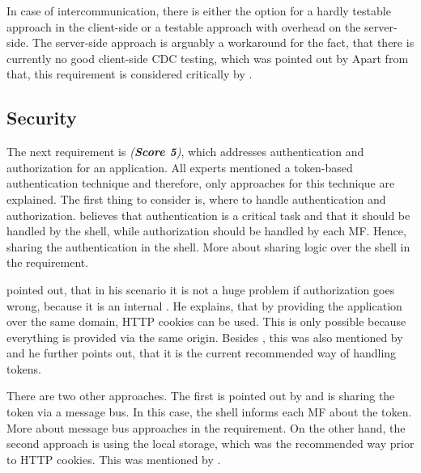 In case of intercommunication, there is either the option for a hardly testable approach in the client-side or a testable approach with overhead on the server-side.
The server-side approach is arguably a workaround for the fact, that there is currently no good client-side \ac{CDC} testing, which was pointed out by \textcite{Laug.2018}
Apart from that, this requirement is considered critically by \textciteOlleck{}.





\subsection{Security}\label{cha:requirement_detail_state_security}

The next requirement is \textit{ (\textbf{Score 5})}, which addresses authentication and authorization for an application.
All experts mentioned a token-based authentication technique and therefore, only approaches for this technique are explained.
The first thing to consider is, where to handle authentication and authorization.
\textcite{Laug.2018} believes that authentication is a critical task and that it should be handled by the shell, while authorization should be handled by each \ac{MF}.
Hence, sharing the authentication in the shell.
More about sharing logic over the shell in the \textit{} requirement.

\textcite{Laug.2018} pointed out, that in his scenario it is not a huge problem if authorization goes wrong, because it is an internal .
He explains, that by providing the application over the same domain, \ac{HTTP} cookies can be used.
This is only possible because everything is provided via the same origin.
Besides \citeauthor{Laug.2018}, this was also mentioned by \textciteSteyer{} and he further points out, that it is the current recommended way of handling tokens\footnotemark.

There are two other approaches.
The first is pointed out by \textciteSteyer{} and is sharing the token via a message bus.
In this case, the shell informs each \ac{MF} about the token.
More about message bus approaches in the \textit{} requirement.
On the other hand, the second approach is using the local storage, which was the recommended way prior to \ac{HTTP} cookies.
This was mentioned by \textciteJovanovic{}.

